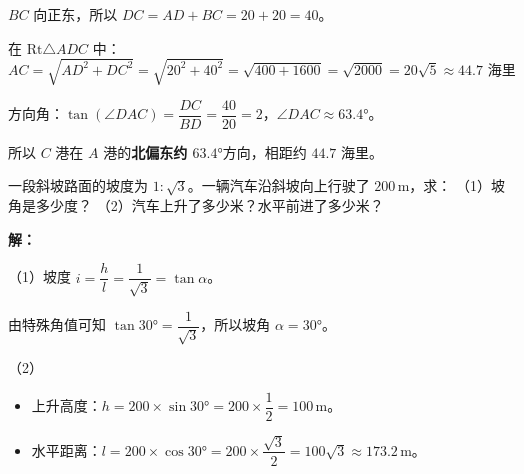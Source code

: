 \documentclass[12pt, a4paper]{ctexart}
\begin{document}
$BC$ 向正东，所以 $DC = AD + BC = 20 + 20 = 40$。

在 $\text{Rt}\triangle ADC$ 中：
\[
AC = \sqrt{AD^2+DC^2} = \sqrt{20^2+40^2} = \sqrt{400+1600} = \sqrt{2000} = 20\sqrt{5} \approx 44.7 \text{ 海里}
\]

方向角：$\tan(\angle DAC) = \dfrac{DC}{BD} = \dfrac{40}{20} = 2$，$\angle DAC \approx 63.4°$。

所以 $C$ 港在 $A$ 港的\textbf{北偏东约 $63.4°$}方向，相距约 $\boxed{44.7 \text{ 海里}}$。

\begin{appbox}[【应用3】坡度计算]
一段斜坡路面的坡度为 $1:\sqrt{3}$。一辆汽车沿斜坡向上行驶了 $200\,\text{m}$，求：
（1）坡角是多少度？
（2）汽车上升了多少米？水平前进了多少米？

\medskip
\begin{center}
\end{center}
\end{appbox}

\textbf{解：}

（1）坡度 $i = \dfrac{h}{l} = \dfrac{1}{\sqrt{3}} = \tan\alpha$。

由特殊角值可知 $\tan 30° = \dfrac{1}{\sqrt{3}}$，所以坡角 $\alpha = \boxed{30°}$。

（2）
\begin{itemize}[nosep, leftmargin=2em]
  \item 上升高度：$h = 200 \times \sin 30° = 200 \times \dfrac{1}{2} = \boxed{100\,\text{m}}$。
  \item 水平距离：$l = 200 \times \cos 30° = 200 \times \dfrac{\sqrt{3}}{2} = \boxed{100\sqrt{3} \approx 173.2\,\text{m}}$。
\end{itemize}

\end{document}
